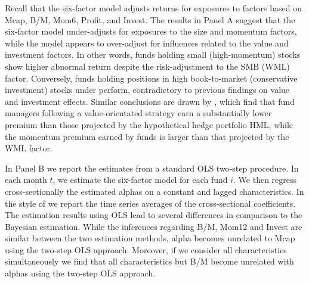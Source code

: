  \par Recall that the six-factor model adjusts returns for exposures to factors based on Mcap, B/M, Mom6, Profit, and Invest. The results in Panel A suggest that the six-factor model under-adjusts for exposures to the size and momentum factors, while the model appears to over-adjust for influences related to the value and investment factors. In other words, funds holding small (high-momentum) stocks show higher abnormal return despite the risk-adjustment to the SMB (WML) factor. Conversely, funds holding positions in high book-to-market (conservative investment) stocks under perform, contradictory to previous findings on value and investment effects. Similar conclusions are drawn by \citet{huij2009use}, which find that fund managers following a value-orientated strategy earn a substantially lower premium than those projected by the hypothetical hedge portfolio HML, while the momentum premium earned by funds is larger than that projected by the WML factor.
 \par In Panel B we report the estimates from a standard OLS two-step procedure. In each month $t$, we estimate the six-factor model for each fund $i$. We then regress cross-sectionally the estimated alphas on a constant and lagged characteristics. In the style of \citet{fama1973risk} we report the time series averages of the cross-sectional coefficients. The estimation results using OLS lead to several differences in comparison to the Bayesian estimation. While the inferences regarding B/M, Mom12 and Invest are similar between the two estimation methods, alpha becomes unrelated to Mcap using the two-step OLS approach. Moreover, if we consider all characteristics simultaneously we find that all characteristics but B/M become unrelated with alphas using the two-step OLS approach. 
